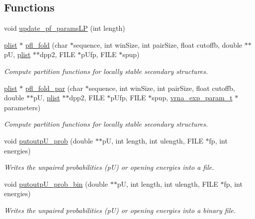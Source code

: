 \subsection*{Functions}
\begin{DoxyCompactItemize}
\item 
void \hyperlink{group__local__pf__fold_ga5a019014d37fe6105131dfc2fc447880}{update\-\_\-pf\-\_\-params\-L\-P} (int length)
\item 
\hyperlink{group__data__structures_gab1d8894b43aa84cbc50b862a73785fbc}{plist} $\ast$ \hyperlink{group__local__pf__fold_ga7dcf599d07258801ea55e7d14a56908d}{pfl\-\_\-fold} (char $\ast$sequence, int win\-Size, int pair\-Size, float cutoffb, double $\ast$$\ast$p\-U, \hyperlink{group__data__structures_gab1d8894b43aa84cbc50b862a73785fbc}{plist} $\ast$$\ast$dpp2, F\-I\-L\-E $\ast$p\-Ufp, F\-I\-L\-E $\ast$spup)
\begin{DoxyCompactList}\small\item\em Compute partition functions for locally stable secondary structures. \end{DoxyCompactList}\item 
\hypertarget{group__local__pf__fold_ga14c2b82fdd5ab7a1951f1c2db4f5cf2c}{\hyperlink{group__data__structures_gab1d8894b43aa84cbc50b862a73785fbc}{plist} $\ast$ \hyperlink{group__local__pf__fold_ga14c2b82fdd5ab7a1951f1c2db4f5cf2c}{pfl\-\_\-fold\-\_\-par} (char $\ast$sequence, int win\-Size, int pair\-Size, float cutoffb, double $\ast$$\ast$p\-U, \hyperlink{group__data__structures_gab1d8894b43aa84cbc50b862a73785fbc}{plist} $\ast$$\ast$dpp2, F\-I\-L\-E $\ast$p\-Ufp, F\-I\-L\-E $\ast$spup, \hyperlink{group__energy__parameters_ga01d8b92fe734df8d79a6169482c7d8d8}{vrna\-\_\-exp\-\_\-param\-\_\-t} $\ast$parameters)}\label{group__local__pf__fold_ga14c2b82fdd5ab7a1951f1c2db4f5cf2c}

\begin{DoxyCompactList}\small\item\em Compute partition functions for locally stable secondary structures. \end{DoxyCompactList}\item 
void \hyperlink{group__local__pf__fold_ga0bcb751860bbf34e3dfee8c2fbdb3ef3}{putoutp\-U\-\_\-prob} (double $\ast$$\ast$p\-U, int length, int ulength, F\-I\-L\-E $\ast$fp, int energies)
\begin{DoxyCompactList}\small\item\em Writes the unpaired probabilities (p\-U) or opening energies into a file. \end{DoxyCompactList}\item 
void \hyperlink{group__local__pf__fold_ga9acb00ee10e96b1ca4ea394cd8bcec75}{putoutp\-U\-\_\-prob\-\_\-bin} (double $\ast$$\ast$p\-U, int length, int ulength, F\-I\-L\-E $\ast$fp, int energies)
\begin{DoxyCompactList}\small\item\em Writes the unpaired probabilities (p\-U) or opening energies into a binary file. \end{DoxyCompactList}\end{DoxyCompactItemize}


